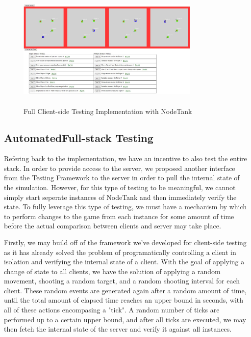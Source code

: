 \documentclass[conference]{IEEEtran}
\begin{document}
\begin{figure}[htbp]
\centerline{\includegraphics [width = 9cm, height = 6cm] {images/FullClientSideTesting.jpg}}
\caption{Full Client-side Testing Implementation with NodeTank}
\end{figure}

\subsection{AutomatedFull-stack Testing}

Refering back to the implementation, we have an incentive to also test the entire stack. In order to provide access to the server, we proposed another interface from the Testing Framework
to the server in order to pull the internal state of the simulation. However, for this type of testing to be meaningful, we cannot simply start seperate instances of NodeTank and then immediately 
verify the state. To fully leverage this type of testing, we must have a mechanism by which to perform changes to the game from each instance for some amount of time before the actual comparison 
between clients and server may take place. 

Firstly, we may build off of the framework we've developed for client-side testing as it has already solved the problem of programatically controlling a client in isolation and verifying the internal
state of a client. With the goal of applying a change of state to all clients, we have the solution of applying a random movement, shooting a random target, and a random shooting interval
for each client. These random events are generated again after a random amount of time, until the total amount of elapsed time reaches an upper bound in seconds, with all of these actions encompasing a "tick".
A random number of ticks are performed up to a certain upper bound, and after all ticks are executed, we may then fetch the internal state of the server and verify it against all instances. 
\end{document}
